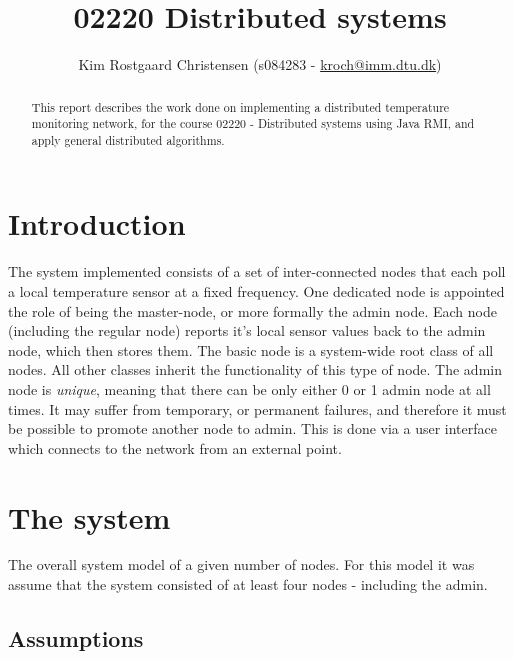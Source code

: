 \documentclass[10pt,a4paper]{article}
\begin{document}
\def\File#1{\textsf{#1}}
\def\Code#1{\texttt{#1}}
\def\Key#1{\textsf{#1}}

\title{02220 Distributed systems}
\author{Kim Rostgaard Christensen (s084283 - \href{mailto:kroch@imm.dtu.dk}{kroch@imm.dtu.dk})}

\maketitle

\tableofcontents

\begin{abstract}
This report describes the work done on implementing a distributed temperature monitoring network, for the course 02220 - Distributed systems using Java RMI, and apply general distributed algorithms.
\end{abstract}

\section{Introduction}
The system implemented consists of a set of inter-connected nodes that each poll a local temperature sensor at a fixed frequency. One dedicated node is appointed the role of being the master-node, or more formally the admin node. Each node (including the regular node) reports it's local sensor values back to the admin node, which then stores them.
The basic node is a system-wide root class of all nodes. All other classes inherit the functionality of this type of node.
The admin node is \emph{unique}, meaning that there can be only either 0 or 1 admin node at all times. It may suffer from temporary, or permanent failures, and therefore it must be possible to promote another node to admin. This is done via a user interface which connects to the network from an external point.

\section{The system}

The overall system model of a given number of nodes. For this model it was assume that the system consisted of at least four nodes - including the admin.

\subsection{Assumptions}
\end{document}
